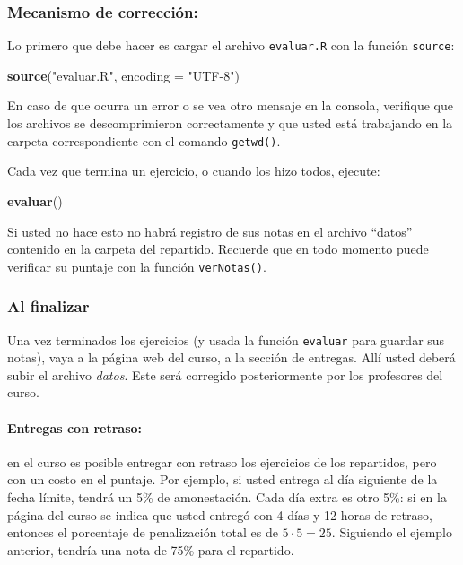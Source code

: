 \documentclass[]{article}
\newenvironment{Shaded}{}{}
\newcommand{\KeywordTok}[1]{\textcolor[rgb]{0.00,0.44,0.13}{\textbf{{#1}}}}
\newcommand{\DataTypeTok}[1]{\textcolor[rgb]{0.56,0.13,0.00}{{#1}}}
\newcommand{\StringTok}[1]{\textcolor[rgb]{0.25,0.44,0.63}{{#1}}}
\newcommand{\NormalTok}[1]{{#1}}
\begin{document}
\subsubsection{Mecanismo de corrección:}

Lo primero que debe hacer es cargar el archivo \texttt{evaluar.R} con la
función \texttt{source}:

\begin{Shaded}
\begin{Highlighting}[]
\KeywordTok{source}\NormalTok{(}\StringTok{"evaluar.R"}\NormalTok{, }\DataTypeTok{encoding =} \StringTok{"UTF-8"}\NormalTok{)}
\end{Highlighting}
\end{Shaded}
En caso de que ocurra un error o se vea otro mensaje en la consola,
verifique que los archivos se descomprimieron correctamente y que usted
está trabajando en la carpeta correspondiente con el comando
\texttt{getwd()}.

Cada vez que termina un ejercicio, o cuando los hizo todos, ejecute:

\begin{Shaded}
\begin{Highlighting}[]
\KeywordTok{evaluar}\NormalTok{()}
\end{Highlighting}
\end{Shaded}
Si usted no hace esto no habrá registro de sus notas en el archivo
``datos'' contenido en la carpeta del repartido. Recuerde que en todo
momento puede verificar su puntaje con la función \texttt{verNotas()}.

\subsubsection{Al finalizar}

Una vez terminados los ejercicios (y usada la función \texttt{evaluar}
para guardar sus notas), vaya a la página web del curso, a la sección de
entregas. Allí usted deberá subir el archivo \emph{datos}. Este será
corregido posteriormente por los profesores del curso.

\paragraph{Entregas con retraso:}

en el curso es posible entregar con retraso los ejercicios de los
repartidos, pero con un costo en el puntaje. Por ejemplo, si usted
entrega al día siguiente de la fecha límite, tendrá un 5\% de
amonestación. Cada día extra es otro 5\%: si en la página del curso se
indica que usted entregó con 4 días y 12 horas de retraso, entonces el
porcentaje de penalización total es de $5 \cdot 5 = 25$. Siguiendo el
ejemplo anterior, tendría una nota de 75\% para el repartido.
\end{document}

